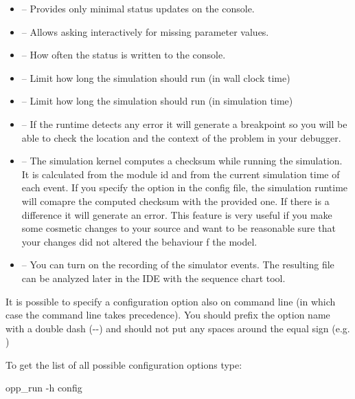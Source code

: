 \begin{itemize}
  \item {} -- Provides only minimal status updates on the console.
  \item {} -- Allows asking interactively for missing
        parameter values.
  \item {} -- How often the status is written to the console.
  \item {} -- Limit how long the simulation should run (in wall clock time)
  \item {} -- Limit how long the simulation should run (in simulation time)
  \item {} -- If the runtime detects any error it will generate a breakpoint
        so you will be able to check the location and the context of the problem in your debugger.
  \item {} -- The simulation kernel computes a checksum while running the simulation.
          It is calculated from the module id and from the current simulation time of each event.
          If you specify the  option in the config file, the simulation runtime will
          comapre the computed checksum with the provided one. If there is a difference it will
          generate an error. This feature is very useful if you make some cosmetic changes to your
          source and want to be reasonable sure that your changes did not altered the behaviour
          f the model.
  \item {} -- You can turn on the recording of the simulator events. The
           resulting file can be analyzed later in the IDE with the sequence chart tool.
\end{itemize}

\begin{note}
  It is possible to specify a configuration option also on command line (in which case the
  command line takes precedence). You should prefix the option name with a double
  dash (-{}-) and should not put any spaces around the equal sign
  (e.g. )
\end{note}

To get the list of all possible configuration options type:

\begin{commandline}
opp_run -h config
\end{commandline}


